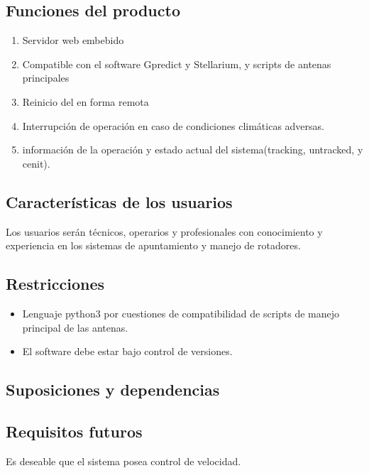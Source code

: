 \documentclass[12pt,a4paper, twosite]{article}
\begin{document}
	\subsection{Funciones del producto}
	\label{sec:orgaf51da6}
	\begin{enumerate}
		\item Servidor web embebido 
		\item Compatible con el software Gpredict y Stellarium, y scripts de antenas principales 
		\item Reinicio del en forma remota  
		\item Interrupción de operación en caso de condiciones climáticas adversas. 
		\item información de la operación y estado actual del sistema(tracking, untracked, y cenit). 
	\end{enumerate}
	
	\subsection{Características de los usuarios}
	\label{sec:orga40b0ee}
	Los usuarios serán técnicos, operarios y profesionales con conocimiento y experiencia en los sistemas de apuntamiento y manejo de rotadores. 
	\subsection{Restricciones}
	\label{sec:org5ca5790}
	
	
	\begin{itemize}
		
		\item Lenguaje python3 por cuestiones de compatibilidad de scripts de manejo principal de las antenas.
		\item El software debe estar bajo control de versiones.  
	\end{itemize}
	
	
	\subsection{Suposiciones y dependencias}
	\label{sec:org0ae23fe}
	
	
	
	\subsection{Requisitos futuros}
	\label{sec:org33cfcdb}
	Es deseable que el sistema posea control de velocidad. 
	
\end{document}
